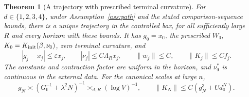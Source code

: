 \documentclass[11pt]{article}
\newtheorem{theorem}{Theorem}[section]
\theoremstyle{definition}
\begin{document}
\begin{theorem}[A trajectory with prescribed terminal curvature]\label{thm:path}
For \(d\in\{1,2,3,4\}\), under Assumption~\ref{ass:path} and the
stated comparison-sequence bounds, there is a unique trajectory in
the controlled box, for all sufficiently large \(R\) and every
horizon with these bounds. It has \(g_0=x_0\), the prescribed
\(W_0\), \(K_0=K_{\rm init}(\beta,\nu_0)\), zero terminal curvature,
and
\begin{equation}
 |g_j-x_j|\le\varepsilon x_j,\qquad
 |\nu_j|\le C\Lambda_R x_j,\qquad
 \|w_j\|\le C,\qquad \|K_j\|\le Cf_j .
\end{equation}
The constants and contraction factor are uniform in the horizon, and
\(\nu_0^*\) is continuous in the external data. For the canonical
scales at large \(n\),
\begin{equation}
 g_N\asymp (G_0^{-1}+\lambda^2N)^{-1}\asymp_{d,R}(\log V)^{-1},
 \qquad
 \|K_N\|\le C(g_N^3+Ud_0^N).
\end{equation}
\end{theorem}
\end{document}
